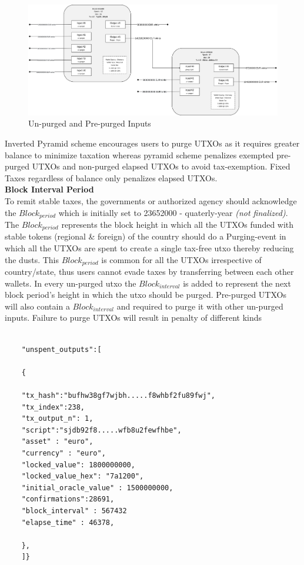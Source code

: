 \documentclass[letterpaper,11pt]{article}
\begin{document}
\begin{figure}
\begin{center}
\includegraphics[width=\textwidth]{stabletaxfig2}
\caption{Un-purged and Pre-purged Inputs}
\end{center}
\end{figure}

Inverted Pyramid scheme encourages users to purge UTXOs as it requires greater balance to minimize taxation whereas pyramid scheme penalizes exempted pre-purged UTXOs and non-purged elapsed UTXOs to avoid tax-exemption. Fixed Taxes regardless of balance only penalizes elapsed UTXOs.\\

\textbf{Block Interval Period}\\

To remit stable taxes, the governments or authorized agency should acknowledge the $Block_{period}$ which is initially set to 23652000 - quaterly-year \textit{(not finalized)}. The $Block_{period}$ represents the block height in which all the UTXOs funded with stable tokens (regional \& foreign) of the country should do a Purging-event in which all the UTXOs are spent to create a single tax-free utxo thereby reducing the dusts. This $Block_{period}$ is common for all the UTXOs irrespective of country/state, thus users cannot evade taxes by transferring between each other wallets. In every un-purged utxo the $Block_{interval}$ is added to represent the next block period's height in which the utxo should be purged. Pre-purged UTXOs will also contain a $Block_{interval}$ and required to purge it with other un-purged inputs. Failure to purge UTXOs will result in penalty of different kinds\\


\begin{lstlisting}[caption={Blinkchain Type 2 UTXO JSON Object Data}, numbers=none]

    "unspent_outputs":[
    
	{
	
	"tx_hash":"bufhw38gf7wjbh.....f8whbf2fu89fwj",
	"tx_index":238,
	"tx_output_n": 1,
	"script":"sjdb92f8.....wfb8u2fewfhbe",
	"asset" : "euro",
	"currency" : "euro",
	"locked_value": 1800000000,
	"locked_value_hex": "7a1200",
	"initial_oracle_value" : 1500000000,
	"confirmations":28691,
	"block_interval" : 567432
	"elapse_time" : 46378,
	
	},
	]}
\end{lstlisting}
\end{document}
